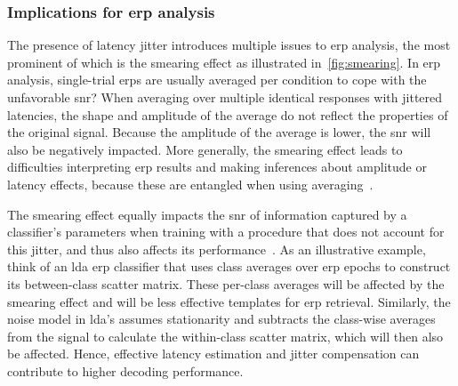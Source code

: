 \subsubsection{Implications for \ac{erp} analysis}

The presence of latency jitter introduces multiple issues to \ac{erp} analysis, the
most prominent of which is the smearing effect as illustrated
in~\autoref{fig:smearing}. In \ac{erp} analysis, single-trial \acp{erp} are usually
averaged per condition to cope with the unfavorable \ac{snr}?
When averaging over multiple identical responses with jittered latencies, the shape
and amplitude of the average do not reflect the properties
of the original signal.
Because the amplitude of the average is lower, the \ac{snr} will also be negatively impacted.
More generally, the smearing effect leads to difficulties interpreting \ac{erp}
results and making inferences about amplitude or latency effects, because these
are entangled when using averaging~\cite{Woody1967, Pfefferbaum1980, McDowell2003, Verleger2005,
	Roth2007, Walhovd2008, Poli2010, Luck2014}.


The smearing effect equally impacts the \ac{snr} of information captured by a
classifier's parameters when training with a procedure that does not account for
this jitter, and thus also affects its performance~\cite{Thompson2012}.
As an illustrative example, think of an \ac{lda} \ac{erp} classifier that uses
class averages over \ac{erp} epochs to construct its between-class scatter
matrix.
These per-class averages will be affected by the smearing effect and will be
less effective templates for \ac{erp} retrieval.
Similarly, the noise model in \ac{lda}'s  assumes stationarity and subtracts
the class-wise averages from the signal to calculate
the within-class scatter matrix, which will then also be affected.
Hence, effective latency estimation and jitter compensation can contribute to higher
decoding performance.

